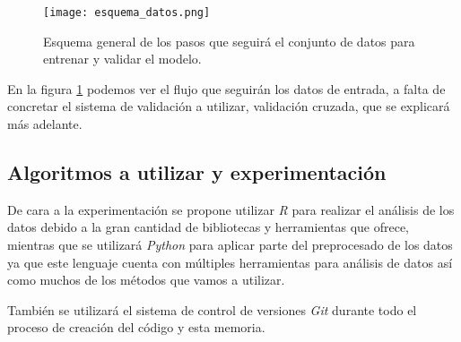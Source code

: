 \begin{figure}[H]
    \centering
	  \texttt{[image: esquema\_datos.png]}
    \caption{Esquema general de los pasos que seguirá el conjunto de datos para entrenar y validar el modelo.}
	 \label{fig:esquema_datos}
\end{figure}

En la figura \ref{fig:esquema_datos} podemos ver el flujo que seguirán los datos de entrada, a falta de concretar el sistema de validación a utilizar, validación cruzada, que se explicará más adelante.

\newpage

\subsection{Algoritmos a utilizar y experimentación}

De cara a la experimentación se propone utilizar \textit{R} para realizar el análisis de los datos debido a la gran cantidad de bibliotecas y herramientas que ofrece, mientras que se utilizará \textit{Python} para aplicar parte del preprocesado de los datos ya que este lenguaje cuenta con múltiples herramientas para análisis de datos así como muchos de los métodos que vamos a utilizar.

También se utilizará el sistema de control de versiones \textit{Git} \cite{git} durante todo el proceso de creación del código y esta memoria.



\newpage
